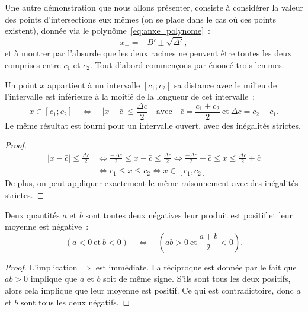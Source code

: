 \documentclass[main.tex]{subfiles}
\begin{document}
Une autre démonstration que nous allons présenter, consiste à considérer la valeur des points d'intersections eux mêmes (on se place dans le cas où ces points existent), donnée via le polynôme~\eqref{eq:anxe_polynome}~:
\begin{equation}
\label{eq:anxe_racines}
x_\pm = -B' \pm \sqrt{\Delta'},
\end{equation}
et à montrer par l'absurde que les deux racines ne peuvent être toutes les deux comprises entre $c_1$ et $c_2$. Tout d'abord commençons par énoncé trois lemmes.
\begin{lemme} \label{lem:distance_milieu}
Un point $x$ appartient à un intervalle $[c_1;c_2]$ \ssi sa distance avec le milieu de l'intervalle est inférieure à la moitié de la longueur de cet intervalle~:
\begin{equation}
x \in [c_1;c_2]
 \quad \Longleftrightarrow \quad 
 | x - \bar{c}  | \leq \frac{\Delta c}{2}  \quad \textrm{avec} \quad \bar{c}=\frac{c_1+c_2}{2} \ \textrm{et} \ \Delta c = c_2-c_1.
\end{equation}
Le même résultat est fourni pour un intervalle ouvert, avec des inégalités strictes.
\end{lemme}
\begin{proof}
\begin{align*}
 | x - \bar{c}  | \leq \frac{\Delta c}{2} & \Longleftrightarrow \frac{-\Delta c}{2} \leq x-\bar{c}\leq \frac{\Delta c }{2}  \Longleftrightarrow \frac{-\Delta c}{2} +\bar{c}\leq x\leq \frac{\Delta c }{2} +\bar{c} \\
 &\Longleftrightarrow c_1 \leq x \leq c_2 \Longleftrightarrow x \in [c_1,c_2]
\end{align*}
De plus, on peut appliquer exactement le même raisonnement avec des inégalités strictes.
\end{proof}
\begin{lemme} \label{lem:qtes_negatives}
Deux quantités $a$ et $b$ sont toutes deux négatives \ssi leur produit est positif et leur moyenne est négative~:
$$ ( a<0\ \textrm{et}\ b<0 ) \quad \Longleftrightarrow \quad \left( ab>0\ \textrm{et}\ \frac{a+b}{2}<0  \right).$$
\end{lemme}
\begin{proof}
L'implication $\Rightarrow$ est immédiate. La réciproque est donnée par le fait que $ab>0$ implique que $a$ et $b$ soit de même signe. S'ils sont tous les deux positifs, alors cela implique que leur moyenne est positif. Ce qui est contradictoire, donc $a$ et $b$ sont tous les deux négatifs.
\end{proof}
\end{document}
